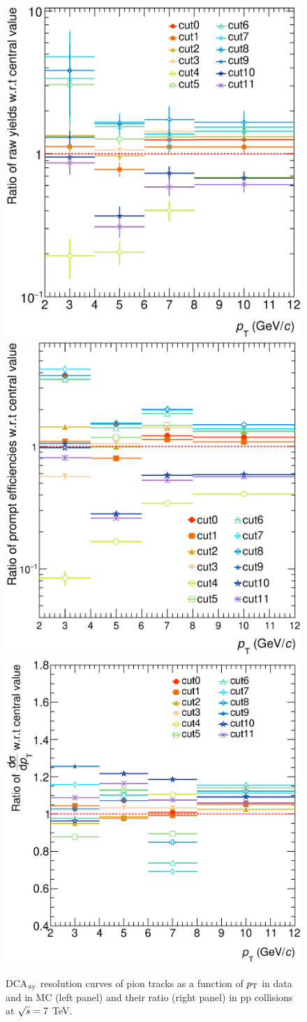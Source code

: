  
\begin{figure}[!h]
\begin{center}
 \includegraphics[width=.49\textwidth]{FigCap4/cutVariationPlot_pass4_rawY.eps}
 \includegraphics[width=.49\textwidth]{FigCap4/efficiencies_cuts0to12.eps}
 \includegraphics[width=.49\textwidth]{FigCap4/cutVariationPlot_pass4.eps}
\caption{DCA$_{\rm xy}$ resolution curves of pion tracks as a function of $p_{\rm T}$ in data and in MC (left panel) and their ratio (right panel) in pp collisions at $\sqrt{s} = 7 $ TeV.}             
\label{fig:cutVar}
\end{center}
\end{figure} 
